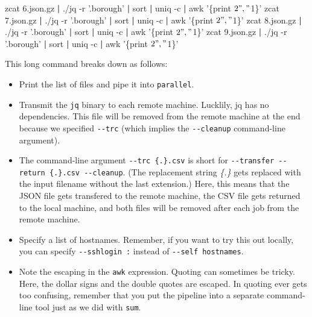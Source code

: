 \documentclass[
]{book}
\newenvironment{Shaded}{\begin{snugshade}}{\end{snugshade}}
\newcommand{\ExtensionTok}[1]{#1}
\newcommand{\FunctionTok}[1]{\textcolor[rgb]{0.00,0.00,0.00}{#1}}
\newcommand{\KeywordTok}[1]{\textcolor[rgb]{0.13,0.29,0.53}{\textbf{#1}}}
\newcommand{\NormalTok}[1]{#1}
\newcommand{\StringTok}[1]{\textcolor[rgb]{0.31,0.60,0.02}{#1}}
\theoremstyle{definition}
\theoremstyle{definition}
\theoremstyle{definition}
\theoremstyle{remark}
\begin{document}
\begin{Shaded}
\begin{Highlighting}[]
\FunctionTok{zcat}\NormalTok{ 6.json.gz }\KeywordTok{|} \ExtensionTok{./jq}\NormalTok{ -r }\StringTok{'.borough'} \KeywordTok{|} \FunctionTok{sort} \KeywordTok{|} \FunctionTok{uniq}\NormalTok{ -c }\KeywordTok{|} \FunctionTok{awk} \StringTok{'\{print $2","$1\}'}
\FunctionTok{zcat}\NormalTok{ 7.json.gz }\KeywordTok{|} \ExtensionTok{./jq}\NormalTok{ -r }\StringTok{'.borough'} \KeywordTok{|} \FunctionTok{sort} \KeywordTok{|} \FunctionTok{uniq}\NormalTok{ -c }\KeywordTok{|} \FunctionTok{awk} \StringTok{'\{print $2","$1\}'}
\FunctionTok{zcat}\NormalTok{ 8.json.gz }\KeywordTok{|} \ExtensionTok{./jq}\NormalTok{ -r }\StringTok{'.borough'} \KeywordTok{|} \FunctionTok{sort} \KeywordTok{|} \FunctionTok{uniq}\NormalTok{ -c }\KeywordTok{|} \FunctionTok{awk} \StringTok{'\{print $2","$1\}'}
\FunctionTok{zcat}\NormalTok{ 9.json.gz }\KeywordTok{|} \ExtensionTok{./jq}\NormalTok{ -r }\StringTok{'.borough'} \KeywordTok{|} \FunctionTok{sort} \KeywordTok{|} \FunctionTok{uniq}\NormalTok{ -c }\KeywordTok{|} \FunctionTok{awk} \StringTok{'\{print $2","$1\}'}
\end{Highlighting}
\end{Shaded}

This long command breaks down as follows:

\begin{itemize}
\item
  Print the list of files and pipe it into \texttt{parallel}.
\item
  Transmit the \texttt{jq} binary to each remote machine. Lucklily, jq has no dependencies. This file will be removed from the remote machine at the end because we specified \texttt{-\/-trc} (which implies the \texttt{-\/-cleanup} command-line argument).
\item
  The command-line argument \texttt{-\/-trc\ \{.\}.csv} is short for \texttt{-\/-transfer\ -\/-return\ \{.\}.csv\ -\/-cleanup}. (The replacement string \emph{\{.\}} gets replaced with the input filename without the last extension.) Here, this means that the JSON file gets transfered to the remote machine, the CSV file gets returned to the local machine, and both files will be removed after each job from the remote machine.
\item
  Specify a list of hostnames. Remember, if you want to try this out locally, you can specify \texttt{-\/-sshlogin\ :} instead of \texttt{-\/-self\ hostnames}.
\item
  Note the escaping in the \texttt{awk} expression. Quoting can sometimes be tricky. Here, the dollar signs and the double quotes are escaped. In quoting ever gets too confusing, remember that you put the pipeline into a separate command-line tool just as we did with \texttt{sum}.
\end{itemize}
\end{document}
